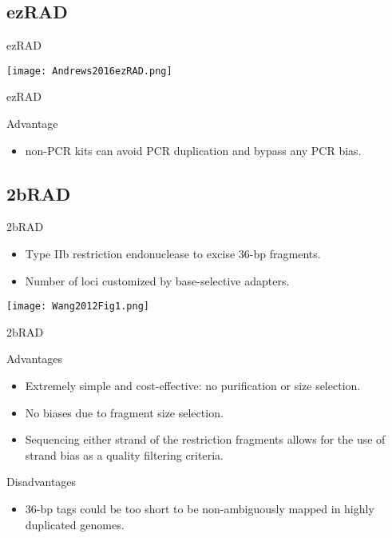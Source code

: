 \documentclass[presentation]{beamer}
\begin{document}
\subsection{ezRAD}
\label{sec-2-3}

\begin{frame}[label=sec-2-3-1]{ezRAD \citep{Toonen2013}}
\begin{center}
\texttt{[image: Andrews2016ezRAD.png]}


\tiny{\citep{Andrews2016}}
\end{center}
\end{frame}
\begin{frame}[label=sec-2-3-2]{ezRAD \citep{Toonen2013}}
\begin{block}{Advantage}
\begin{itemize}
\item non-PCR kits can avoid PCR duplication and bypass any PCR bias.
\end{itemize}
\end{block}
\end{frame}

\subsection{2bRAD}
\label{sec-2-4}
\begin{frame}[label=sec-2-4-1]{2bRAD \citep{Wang2012}}
\begin{itemize}
\item Type IIb restriction endonuclease to excise 36-bp fragments.
\item Number of loci customized by base-selective adapters.
\end{itemize}

\begin{center}
\texttt{[image: Wang2012Fig1.png]}


\tiny{\citep{Wang2012}}
\end{center}
\end{frame}

\begin{frame}[label=sec-2-4-2]{2bRAD \citep{Wang2012}}
\begin{block}{Advantages}
\begin{itemize}
\item Extremely simple and cost-effective: no purification or size selection.
\item No biases due to fragment size selection.
\item Sequencing either strand of the restriction fragments allows for the
use of strand bias as a quality filtering criteria.
\end{itemize}
\end{block}
\begin{block}{Disadvantages}
\begin{itemize}
\item 36-bp tags could be too short to be non-ambiguously mapped in highly
duplicated genomes.
\end{itemize}
\end{block}
\end{frame}
\end{document}

